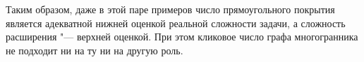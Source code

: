 Таким образом, даже в этой паре примеров число прямоугольного покрытия является адекватной нижней оценкой реальной сложности задачи, а сложность расширения "--- верхней оценкой. При этом кликовое число графа многогранника не подходит ни на ту ни на другую роль.

\begin{comment}
В~заключение заметим, что задача распознавания вершины для $Y^d_n$ имеет экспоненциальную сложность. Строго говоря, это не соответствует замечанию~\ref{rem:PolyPred} к определению задачи комбинаторной оптимизации и уcловию <<комбинаторности>> семейства многогранников в определении~\ref{def:family}. 
Тем не менее, при определении $Y(K,d)$ можно рассмотреть NP"~полную  функцию $h$. В таком случае задача линейной оптимизации на $Y(K,d)$ становится NP"~трудной.
С другой стороны, согласно следствию~\ref{cor:SAT2BQP}, такое семейство многогранников расширенно аффинно сводится к булевым квадратичным многогранникам.
\end{comment}



%
%

